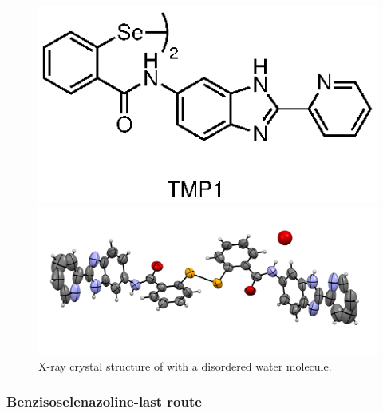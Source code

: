\begin{refsection}
\begin{figure}
    \centering
    \includegraphics[scale=0.74]{Figures/ebs-rhs-diselenide.eps}

    \includegraphics[width=0.8\linewidth]{Figures/diselenide-benzimidazole-2py-xray.pdf}
    \caption[X-ray crystal structure of .]{X-ray crystal structure of  with a disordered water molecule.}\label{fig:diselenide-benzimidazole-2py-xray}
\end{figure}

\subsubsection{Benzisoselenazoline-last route}


\end{refsection}
